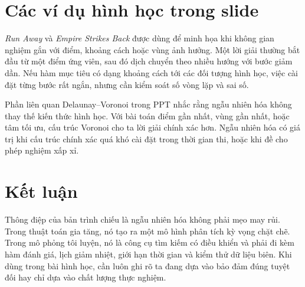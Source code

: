 \documentclass[11pt]{article}
\begin{document}
\section{Các ví dụ hình học trong slide}

\textit{Run Away} và \textit{Empire Strikes Back} được dùng để minh họa khi
không gian nghiệm gắn với điểm, khoảng cách hoặc vùng ảnh hưởng. Một lời giải
thường bắt đầu từ một điểm ứng viên, sau đó dịch chuyển theo nhiều hướng với
bước giảm dần. Nếu hàm mục tiêu có dạng khoảng cách tới các đối tượng hình
học, việc cài đặt từng bước rất ngắn, nhưng cần kiểm soát số vòng lặp và sai
số.

Phần liên quan Delaunay--Voronoi trong PPT nhắc rằng ngẫu nhiên hóa không thay
thế kiến thức hình học. Với bài toán điểm gần nhất, vùng gần nhất, hoặc tâm
tối ưu, cấu trúc Voronoi cho ta lời giải chính xác hơn. Ngẫu nhiên hóa có giá
trị khi cấu trúc chính xác quá khó cài đặt trong thời gian thi, hoặc khi đề
cho phép nghiệm xấp xỉ.

\section{Kết luận}

Thông điệp của bản trình chiếu là ngẫu nhiên hóa không phải mẹo may rủi. Trong
thuật toán gia tăng, nó tạo ra một mô hình phân tích kỳ vọng chặt chẽ. Trong
mô phỏng tôi luyện, nó là công cụ tìm kiếm có điều khiển và phải đi kèm hàm
đánh giá, lịch giảm nhiệt, giới hạn thời gian và kiểm thử dữ liệu biên. Khi
dùng trong bài hình học, cần luôn ghi rõ ta đang dựa vào bảo đảm đúng tuyệt đối
hay chỉ dựa vào chất lượng thực nghiệm.
\end{document}
